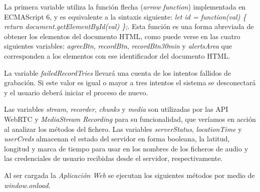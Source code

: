 La primera variable utiliza la función flecha (\emph{arrow function}) implementada en ECMAScript 6, y es equivalente a la sintaxis siguiente: \emph{let id = function(val) \{ return document.getElementById(val) \};}. Esta función es una forma abreviada de obtener los elementos del documento HTML, como puede verse en las cuatro siguientes variables: \emph{agreeBtn}, \emph{recordBtn}, \emph{recordBtn30min} y \emph{alertsArea} que corresponden a los elementos con ese identificador del documento HTML.

La variable \emph{failedRecordTries} llevará una cuenta de los intentos fallidos de grabación. Si este valor es igual o mayor a tres intentos el sistema se desconectará y el usuario deberá iniciar el proceso de nuevo.

Las variables \emph{stream}, \emph{recorder}, \emph{chunks} y \emph{media} son utilizadas por las API WebRTC y \emph{MediaStream Recording} para su funcionalidad, que veríamos en acción al analizar los métodos del fichero. Las variables \emph{serverStatus}, \emph{locationTime} y \emph{userCreds} almacenan el estado del servidor en forma booleana, la latitud, longitud y marca de tiempo para usar en los nombres de los ficheros de audio y las credenciales de usuario recibidas desde el servidor, respectivamente.

Al ser cargada la \emph{Aplicación Web} se ejecutan los siguientes métodos por medio de \emph{window.onload}.


